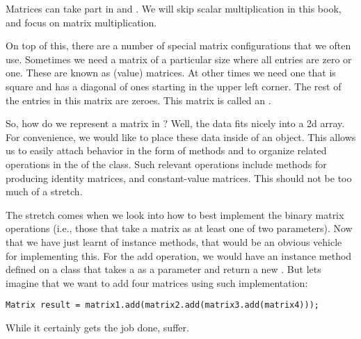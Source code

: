 Matrices can take part in  and . We will skip scalar multiplication in this book, and focus on matrix multiplication.


On top of this, there are a number of special matrix configurations that we often use. Sometimes we need a matrix of a particular size where all entries are zero or one. These are known as  (value) matrices. At other times we need one that is square and has a diagonal of ones starting in the upper left corner. The rest of the entries in this matrix are zeroes. This matrix is called an .

\csharpsubsection{\csharp}

So, how do we represent a matrix in \csharp? Well, the data fits nicely into a 2d array. For convenience, we would like to place these data inside of an object. This allows us to easily attach behavior in the form of methods and to organize related operations in the  of the class. Such relevant operations include methods for producing identity matrices, and constant-value matrices. This should not be too much of a stretch.

The stretch comes when we look into how to best implement the binary matrix operations (i.e., those that take a matrix as at least one of two parameters). Now that we have just learnt of instance methods, that would be an obvious vehicle for implementing this. For the add operation, we would have an instance method defined on a  class that takes a  as a parameter and return a new . But lets imagine that we want to add four matrices using such implementation:
\begin{verbatim}
Matrix result = matrix1.add(matrix2.add(matrix3.add(matrix4)));
\end{verbatim}
While it certainly gets the job done,  suffer.


